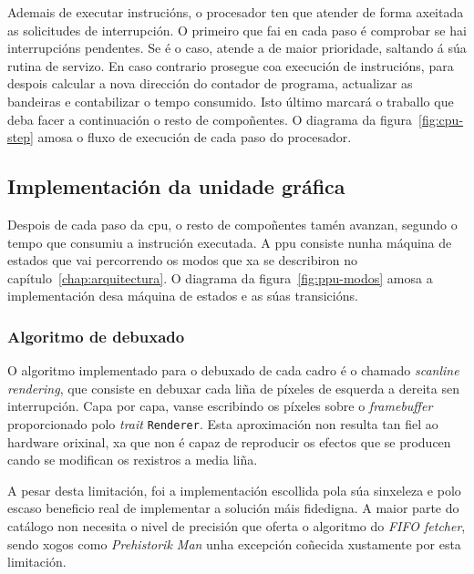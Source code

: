Ademais de executar instrucións, o procesador ten que atender de forma axeitada as solicitudes de interrupción.
O primeiro que fai en cada paso é comprobar se hai interrupcións pendentes.
Se é o caso, atende a de maior prioridade, saltando á súa rutina de servizo.
En caso contrario prosegue coa execución de instrucións, para despois calcular a nova dirección do contador de programa, actualizar as bandeiras e contabilizar o tempo consumido.
Isto último marcará o traballo que deba facer a continuación o resto de compoñentes.
O diagrama da figura~\ref{fig:cpu-step} amosa o fluxo de execución de cada paso do procesador.




\subsection{Implementación da unidade gráfica}
\label{sec:ppu-implementation}

Despois de cada paso da \acrshort{cpu}, o resto de compoñentes tamén avanzan, segundo o tempo que consumiu a instrución executada.
A \acrshort{ppu} consiste nunha máquina de estados que vai percorrendo os modos que xa se describiron no capítulo~\ref{chap:arquitectura}.
O diagrama da figura~\ref{fig:ppu-modos} amosa a implementación desa máquina de estados e as súas transicións.




\subsubsection{Algoritmo de debuxado}
O algoritmo implementado para o debuxado de cada cadro é o chamado \textit{scanline rendering}, que consiste en debuxar cada liña de píxeles de esquerda a dereita sen interrupción.
Capa por capa, vanse escribindo os píxeles sobre o \textit{framebuffer} proporcionado polo \textit{trait} \texttt{Renderer}.
Esta aproximación non resulta tan fiel ao hardware orixinal, xa que non é capaz de reproducir os efectos que se producen cando se modifican os rexistros a media liña.

A pesar desta limitación, foi a implementación escollida pola súa sinxeleza e polo escaso beneficio real de implementar a solución máis fidedigna.
A maior parte do catálogo non necesita o nivel de precisión que oferta o algoritmo do \textit{FIFO fetcher}, sendo xogos como
\textit{Prehistorik Man} unha excepción coñecida xustamente por esta limitación.


